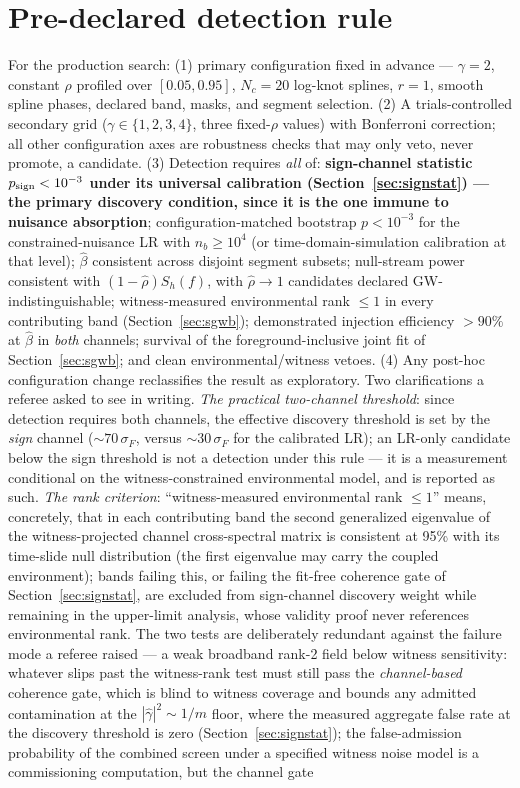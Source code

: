 \documentclass[11pt]{article}
\newcommand{\Sh}{S_h}
\newcommand{\betaeff}{\beta}
\begin{document}
\section{Pre-declared detection rule}
\label{sec:rule}

For the production search: (1) primary configuration fixed in advance --- $\gamma = 2$, constant $\rho$ profiled over $[0.05, 0.95]$, $N_c = 20$ log-knot splines, $r = 1$, smooth spline phases, declared band, masks, and segment selection. (2) A trials-controlled secondary grid ($\gamma \in \{1,2,3,4\}$, three fixed-$\rho$ values) with Bonferroni correction; all other configuration axes are robustness checks that may only veto, never promote, a candidate. (3) Detection requires \emph{all} of: \textbf{sign-channel statistic $p_{\rm sign} < 10^{-3}$ under its universal calibration (Section~\ref{sec:signstat}) --- the primary discovery condition, since it is the one immune to nuisance absorption}; configuration-matched bootstrap $p < 10^{-3}$ for the constrained-nuisance LR with $n_b \ge 10^4$ (or time-domain-simulation calibration at that level); $\hat\betaeff$ consistent across disjoint segment subsets; null-stream power consistent with $(1-\hat\rho)\Sh(f)$, with $\hat\rho \to 1$ candidates declared GW-indistinguishable; witness-measured environmental rank $\le 1$ in every contributing band (Section~\ref{sec:sgwb}); demonstrated injection efficiency $>90\%$ at $\hat\betaeff$ in \emph{both} channels; survival of the foreground-inclusive joint fit of Section~\ref{sec:sgwb}; and clean environmental/witness vetoes. (4) Any post-hoc configuration change reclassifies the result as exploratory. Two clarifications a referee asked to see in writing. \emph{The practical two-channel threshold}: since detection requires both channels, the effective discovery threshold is set by the \emph{sign} channel ($\sim$$70\,\sigma_F$, versus $\sim$$30\,\sigma_F$ for the calibrated LR); an LR-only candidate below the sign threshold is not a detection under this rule --- it is a measurement conditional on the witness-constrained environmental model, and is reported as such. \emph{The rank criterion}: ``witness-measured environmental rank $\le 1$'' means, concretely, that in each contributing band the second generalized eigenvalue of the witness-projected channel cross-spectral matrix is consistent at 95\% with its time-slide null distribution (the first eigenvalue may carry the coupled environment); bands failing this, or failing the fit-free coherence gate of Section~\ref{sec:signstat}, are excluded from sign-channel discovery weight while remaining in the upper-limit analysis, whose validity proof never references environmental rank. The two tests are deliberately redundant against the failure mode a referee raised --- a weak broadband rank-2 field below witness sensitivity: whatever slips past the witness-rank test must still pass the \emph{channel-based} coherence gate, which is blind to witness coverage and bounds any admitted contamination at the $|\hat\gamma|^2 \sim 1/m$ floor, where the measured aggregate false rate at the discovery threshold is zero (Section~\ref{sec:signstat}); the false-admission probability of the combined screen under a specified witness noise model is a commissioning computation, but the channel gate 
\end{document}

